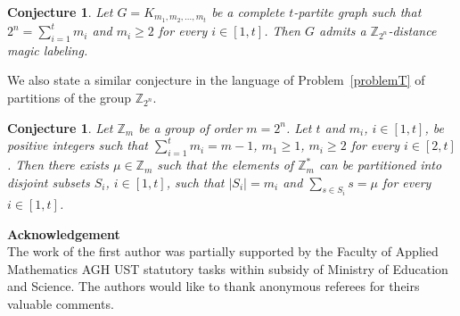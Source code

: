 \documentclass[final]{dmtcs-episciences}
\newtheorem{conj}[thm]{Conjecture}
\newcommand{\zet}{\mathbb{Z}}
\begin{document}
\begin{conj}
Let $G = K_{m_1,m_2,\ldots,m_t}$ be a complete $t$-partite graph such that $2^n = \sum_{i=1}^{t} m_i$ and $m_i\geq 2$ for every $i\in[1,t]$. Then $G$ admits a $\zet_{2^n}$-distance magic labeling.
\end{conj}

We also state a similar conjecture in the language of Problem~\ref{problemT} of partitions of the group $\zet_{2^n}$.

\begin{conj}
Let $\zet_m$ be a group of order $m=2^n$. Let $t$ and $m_i$, $i\in[1,t]$, be positive integers  such that $\sum_{i=1}^t m_i=m-1$, $m_1\geq1$, $m_i\geq 2$ for every $i\in[2, t]$. Then there exists $\mu\in\zet_m$ such that the elements of $\zet_m^*$ can be partitioned into disjoint subsets $S_i$, $i\in[1,t]$, such that $|S_i|=m_i$ and $\sum_{s\in S_i}s=\mu$ for every $i\in[1,t]$.
\end{conj}

\textbf{Acknowledgement}\\
The work of the first author was partially supported by the Faculty of Applied Mathematics AGH UST statutory tasks within subsidy of Ministry of Education and Science. The authors would like to thank anonymous referees for theirs valuable comments.



\newpage
\end{document}
